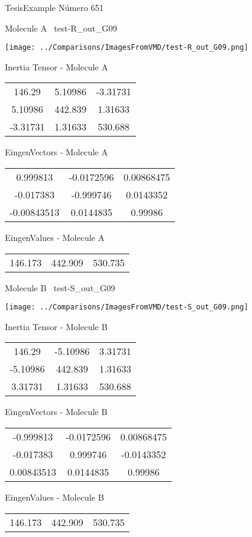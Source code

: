 \vtab[-3cm]
\begin{center}
{\large TesisExample \tab Número 651}
\end{center}
\begin{multicols}{2}
\begin{center}

Molecule A \
test-R\_out\_G09

\texttt{[image: ../Comparisons/ImagesFromVMD/test-R\_out\_G09.png]}

Inertia Tensor - Molecule A \\
\begin{tabular}{|c c c|}
146.29	 & 	5.10986	 & 	-3.31731	 \\
5.10986	 & 	442.839	 & 	1.31633	 \\
-3.31731	 & 	1.31633	 & 	530.688
\end{tabular}

\vtab
 EingenVectors - Molecule A     \\
\begin{tabular}{|c c c|}
0.999813	 & 	-0.0172596	 & 	0.00868475	 \\
-0.017383	 & 	-0.999746	 & 	0.0143352	 \\
-0.00843513	 & 	0.0144835	 & 	0.99986
\end{tabular}

\vtab
 EingenValues - Molecule A     \\
\begin{tabular}{|c c c|}
146.173	 & 	442.909	 & 	530.735	 \\
\end{tabular}
\columnbreak

Molecule B \
test-S\_out\_G09

\texttt{[image: ../Comparisons/ImagesFromVMD/test-S\_out\_G09.png]}

Inertia Tensor - Molecule B \\
\begin{tabular}{|c c c|}
146.29	 & 	-5.10986	 & 	3.31731	 \\
-5.10986	 & 	442.839	 & 	1.31633	 \\
3.31731	 & 	1.31633	 & 	530.688
\end{tabular}

\vtab
 EingenVectors - Molecule B     \\
\begin{tabular}{|c c c|}
-0.999813	 & 	-0.0172596	 & 	0.00868475	 \\
-0.017383	 & 	0.999746	 & 	-0.0143352	 \\
0.00843513	 & 	0.0144835	 & 	0.99986
\end{tabular}

\vtab
 EingenValues - Molecule B     \\
\begin{tabular}{|c c c|}
146.173	 & 	442.909	 & 	530.735	 \\
\end{tabular}

\end{center}
\end{multicols}


